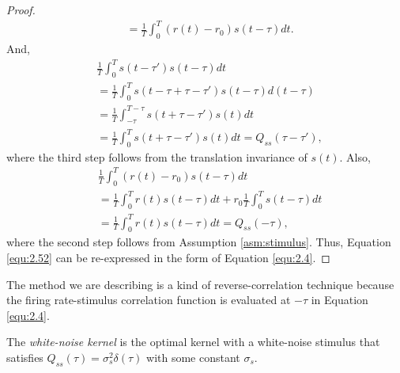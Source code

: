 \begin{proof}
\begin{equation}
\begin{aligned}
      &= \frac{1}{T}\int_0^{T}(r(t)-r_0)s(t-\tau)dt.
    \end{aligned}
  \end{equation}
  And,
  \begin{displaymath}
    \begin{aligned}
      &\frac{1}{T}\int_0^{T}s(t-\tau')s(t-\tau)dt\\
      &= \frac{1}{T}\int_0^{T}s(t-\tau+\tau-\tau')s(t-\tau)d(t-\tau)\\
      &= \frac{1}{T}\int_{-\tau}^{T-\tau}s(t+\tau-\tau')s(t)dt\\
      &= \frac{1}{T}\int_{0}^{T}s(t+\tau-\tau')s(t)dt = Q_{ss}(\tau-\tau'),
    \end{aligned}
  \end{displaymath}
  where the third step follows from the translation invariance of $s(t)$. Also,
  \begin{displaymath}
    \begin{aligned}
      &\frac{1}{T}\int_0^{T}(r(t)-r_0)s(t-\tau)dt\\
      &= \frac{1}{T}\int_0^{T}r(t)s(t-\tau)dt + r_0\frac{1}{T}\int_0^{T}s(t-\tau)dt\\
      &= \frac{1}{T}\int_0^{T}r(t)s(t-\tau)dt = Q_{ss}(-\tau),
    \end{aligned}
  \end{displaymath}
  where the second step follows from Assumption \ref{asm:stimulus}.
  Thus, Equation \ref{equ:2.52} can be re-expressed in the form of Equation \ref{equ:2.4}.
\end{proof}

\begin{rem}
  The method we are describing is a kind of reverse-correlation technique because the firing rate-stimulus correlation function is evaluated at $-\tau$ in Equation \ref{equ:2.4}.
\end{rem}

\begin{defn}
  \label{def:WhiteNoiseKernel}
  The \emph{white-noise kernel} is the optimal kernel with a white-noise stimulus that satisfies $Q_{ss}(\tau) = \sigma_s^2\delta(\tau)$ with some constant $\sigma_s$.
\end{defn}

